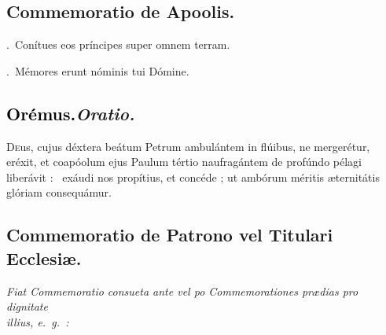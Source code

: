 \documentclass[12pt]{article} %
\newenvironment{rubric}{\vspace{2 mm}\color{benred8} \itshape \leftskip 0in \setlength{\parindent}{0.25in}}{\vspace{2 mm}}
\newenvironment{response}{\leftskip 0in \setlength{\parindent}{0in}}{\vspace{2 mm}}
\let\oldgresixstar\gresixstar
\renewcommand{\gresixstar}{\textcolor{benred8}{\oldgresixstar}}
\let\oldVbar\Vbar
\renewcommand{\Vbar}{\textcolor{benred8}{\oldVbar .}}
\let\oldRbar\Rbar
\renewcommand{\Rbar}{\textcolor{benred8}{\oldRbar .}}
\def\capitulumSpace{\hspace{20 mm}}
\begin{document}
\subsection*{Commemoratio de Apoolis.}


\gresetfirstlineaboveinitial{\small \textsc{ \textbf{\textcolor{benred8}{VIII}}}}{\small \textsc{ \textbf{\textcolor{benred8}{VIII}}}}

\begin{response}
\Vbar\ Con\'{i}tues eos pr\'{i}ncipes super omnem terram.

\Rbar\ M\'{e}mores erunt n\'{o}minis tui D\'{o}mine.

\end{response}

\subsection*{\textcolor{black}{Or\'{e}mus.}\capitulumSpace \emph{Oratio.}}

\begin{response}\lettrine{D}{e}us, cujus d\'{e}xtera be\'{a}tum Petrum ambul\'{a}ntem in fl\'{u}ibus, ne merger\'{e}tur, er\'{e}xit, et coap\'{o}olum ejus Paulum t\'{e}rtio naufrag\'{a}ntem de prof\'{u}ndo p\'{e}lagi liber\'{a}vit : \gresixstar\ ex\'{a}udi nos prop\'{i}tius, et conc\'{e}de ; ut amb\'{o}rum m\'{e}ritis \ae ternit\'{a}tis gl\'{o}riam consequ\'{a}mur.

\end{response}

\newpage


\subsection*{Commemoratio de Patrono vel Titulari Ecclesi\ae .}

\begin{rubric}
Fiat Commemoratio consueta ante vel po Commemorationes pr\ae dias pro dignitate\\illius, e.~g.~:

\end{rubric}
\end{document}
